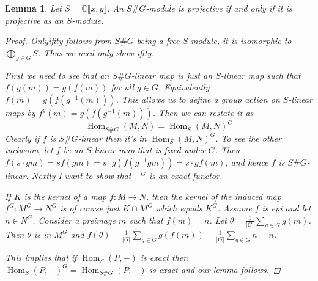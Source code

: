 \documentclass[11pt, a4paper, english]{article}
\numberwithin{prop}{section}
\newtheorem{lemma}{Lemma}
\numberwithin{lemma}{section}
\numberwithin{theorem}{section}
\numberwithin{defin}{section}
\numberwithin{example}{section}
\newcommand{\C}{\mathbb{C}}
\DeclareMathOperator{\Hom}{Hom}
\begin{document}
\begin{lemma}
\label{lem:S proj => SG proj}
Let $S = \C\llbracket x, y \rrbracket$. An $S\#G$-module is projective if and only if it is projective as an $S$-module.

\begin{proof}
Onlyifity follows from $S\#G$ being a free $S$-module, it is isomorphic to $\bigoplus_{g \in G} S$. Thus we need only show ifity.

First we need to see that an $S\#G$-linear map is just an $S$-linear map such that $f(g(m))=g(f(m))$ for all $g \in G$. Equivalently $f(m) = g(f(g^{-1}(m)))$. This allows us to define a group action on $S$-linear maps by $f^g(m) = g(f(g^{-1}(m)))$. Then we can restate it as $$ \Hom_{S\#G}(M,N) = \Hom_S(M,N)^G$$
Clearly if $f$ is $S\#G$-linear then it's in $\Hom_S(M,N)^G$. To see the other inclusion, let $f$ be an $S$-linear map that is fixed under $G$. Then $f(s\cdot g m) = s f(g m) = s\cdot g(f(g^{-1} g m)) = s \cdot g f(m) $, and hence $f$ is $S\#G$-linear. Nextly I want to show that $-^G$ is an exact functor.

If $K$ is the kernel of a map $f: M \to N$, then the kernel of the induced map $f^G : M^G \to N^G$ is of course just $K \cap M^G$ which equals $K^G$. Assume $f$ is epi and let $n \in N^G$. Consider a preimage $m$ such that $f(m)=n$. Let $\theta = \frac{1}{|G|}\sum_{g \in G} g(m)$. Then $\theta$ is in $M^G$ and $f(\theta) = \frac{1}{|G|}\sum_{g \in G} g(f(m)) = \frac{1}{|G|}\sum_{g \in G} n = n$.

This implies that if $\Hom_S(P, -)$ is exact then $\Hom_S(P, -)^G = \Hom_{S\#G}(P, -)$ is exact and our lemma follows.
\end{proof}
\end{lemma}
\end{document}
